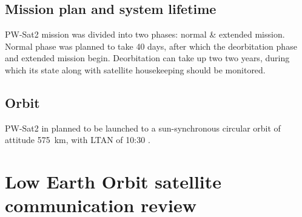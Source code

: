     \subsection{Mission plan and system lifetime}
        PW-Sat2 mission was divided into two phases: normal \& extended mission. Normal phase was planned to take 40 days, after which the deorbitation phase and extended mission begin. Deorbitation can  take up two two years, during which its state along with satellite housekeeping should be monitored.

    \subsection{Orbit}
        PW-Sat2 in planned to be launched to a sun-synchronous circular orbit of attitude \SI{575}{\kilo\meter}, with LTAN of 10:30 \cite{PWSAT_MA_CDR}.



\section{Low Earth Orbit satellite communication review}



